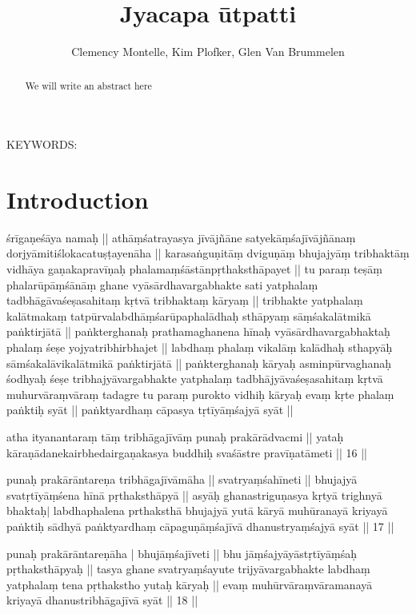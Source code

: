 \documentclass[10pt]{article}
\begin{document}
\title{Jyacapa ūtpatti}
\author{Clemency Montelle, Kim Plofker, Glen Van Brummelen}

\maketitle

\begin{abstract}
We will write an abstract here
\end{abstract}


\vskip30pt

KEYWORDS: 

\newpage

\section{Introduction} 






śrīgaṇeśāya namaḥ ||  
athāṃśatrayasya jīvājñāne satyekāṃśajīvājñānaṃ 
dorjyāmitiślokacatuṣṭayenāha || 
karasaṅguṇitāṃ dviguṇāṃ bhujajyāṃ 
tribhaktāṃ vi\-dhāya 
gaṇakapravīṇaḥ phalamaṃśāstānpṛthaksthāpayet ||
tu paraṃ teṣāṃ phala\-rūpāṃśānāṃ ghane  vyāsārdhavargabhakte sati 
yatphalaṃ tadbhāgāvaśeṣasahitaṃ kṛtvā tribhaktaṃ kāryaṃ ||
tribhakte yatphalaṃ kalātmakaṃ tatpūrvalabdhāṃśarūpaphalādhaḥ sthāpyaṃ sāṃśakalātmikā paṅktirjātā ||
paṅkterghanaḥ prathamaghanena hīnaḥ vyā\-sārdhavargabhaktaḥ phalaṃ śeṣe yojyatribhirbhajet ||
labdhaṃ phalaṃ vikalāṃ kalādhaḥ sthapyāḥ sāmśakalāvikalātmikā
paṅktirjātā || 
paṅkterghanaḥ kāryaḥ 
 asminpūrvaghanaḥ śodhyaḥ śeṣe tribhajyāvargabhakte yatphalaṃ tadbhājyāvaśeṣasahitaṃ 
 kṛtvā muhurvāraṃvāraṃ tadagre tu paraṃ purokto vidhiḥ kāryaḥ evaṃ kṛte phalaṃ paṅktiḥ syāt || 
paṅktyardhaṃ cāpasya tṛtīyāṃśajyā syāt || 

atha ityanantaraṃ tāṃ tribhāgajīvāṃ punaḥ prakārādvacmi || 
yataḥ kāra\-ṇādanekairbhedairgaṇakasya buddhiḥ svaśāstre 
pravīṇatāmeti  || 16 || 

punaḥ prakārāntareṇa  tribhāgajīvāmāha || 
svatryaṃśahīneti || 
bhujajyā sva\-tṛtīyāṃśena hīnā pṛthaksthāpyā || 
asyāḥ  ghanastriguṇasya kṛtyā trighnyā bhaktaḥ\(|\) 
labdhaphalena prthaksthā bhujajyā yutā 
 kāryā muhūranayā kriyayā paṅktiḥ sādhyā
 paṅktyardhaṃ cāpaguṇāṃśajīvā
 dhanustryaṃśajyā syāt  || 17 || 
 
punaḥ prakārāntareṇāha | bhujāṃśajīveti || 
bhu%
jāṃśa\-jyāyāstṛtīyāṃśaḥ pṛthaksthāpyaḥ || 
tasya ghane svatryaṃśayute trijyāvargabhakte labdhaṃ 
yatphalaṃ tena pṛthakstho yutaḥ kāryaḥ || 
evaṃ muhūrvāraṃvāramanayā kriyayā dhanustribhāgajīvā syāt  || 18 || 
 
\end{document}
